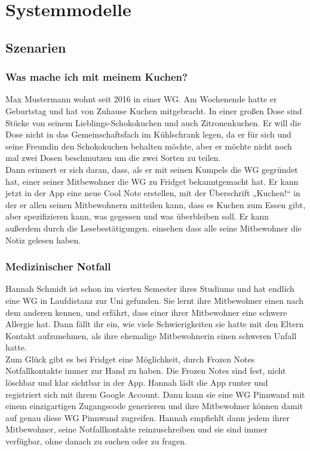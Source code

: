 \documentclass[a4paper]{scrreprt}
\begin{document}
    \chapter{Systemmodelle}
        \section{Szenarien}
        
        
        \subsection{Was mache ich mit meinem Kuchen?}
        Max Mustermann wohnt seit 2016 in einer WG. Am Wochenende hatte er Geburtstag und hat von Zuhause Kuchen mitgebracht. In einer großen Dose sind Stücke von seinem Lieblings-Schokokuchen und auch Zitronenkuchen. Er will die Dose nicht in das Gemeinschaftsfach im Kühlschrank legen, da er für sich und seine Freundin den Schokokuchen behalten möchte, aber er möchte nicht noch mal zwei Dosen beschmutzen um die zwei Sorten zu teilen.\\
        Dann erinnert er sich daran, dass, als er mit seinen Kumpels die WG gegründet hat, einer seiner Mitbewohner die WG zu Fridget bekanntgemacht hat. Er kann jetzt in der App eine neue Cool Note erstellen, mit der Überschrift „Kuchen!“ in der er allen seinen Mitbewohnern mitteilen kann, dass es Kuchen zum Essen gibt, aber spezifizieren kann, was gegessen und was überbleiben soll. Er kann außerdem durch die Lesebestätigungen. einsehen dass alle seine Mitbewohner die Notiz gelesen haben.
        \\
        
        \subsection{Medizinischer Notfall}
        Hannah Schmidt ist schon im vierten Semester ihres Studiums und hat endlich eine WG in Laufdistanz zur Uni gefunden. Sie lernt ihre Mitbewohner einen nach dem anderen kennen, und erfährt, dass einer ihrer Mitbewohner eine schwere Allergie hat. Dann fällt ihr ein, wie viele Schwierigkeiten sie hatte mit den Eltern Kontakt aufzunehmen, als ihre ehemalige Mitbewohnerin einen schweren Unfall hatte.\\
        Zum Glück gibt es bei Fridget eine Möglichkeit, durch Frozen Notes Notfallkontakte immer zur Hand zu haben. Die Frozen Notes sind fest, nicht löschbar und klar sichtbar in der App. Hannah lädt die App runter und registriert sich mit ihrem Google Account. Dann kann sie eine WG Pinnwand mit einem einzigartigen Zugangscode generieren und ihre Mitbewohner können damit auf genau diese WG Pinnwand zugreifen. Hannah empfiehlt dann jedem ihrer Mitbewohner, seine Notfallkontakte reinzuschreiben und sie sind immer verfügbar, ohne danach zu suchen oder zu fragen.
        \newpage
        
\end{document}
